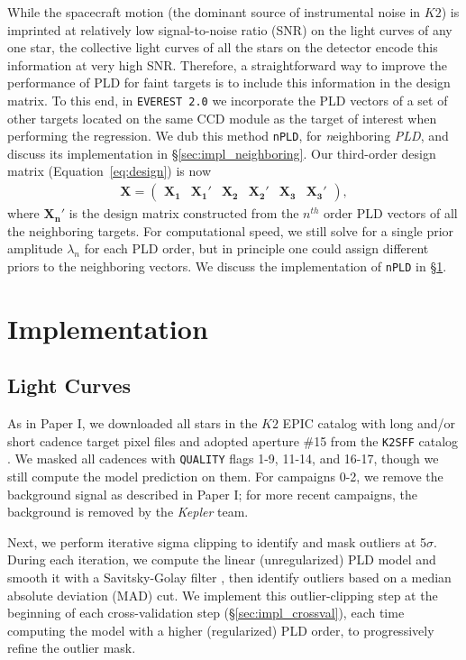 \documentclass[]{emulateapj}
\begin{document}
While the spacecraft motion (the dominant source of instrumental noise in $K2$) is imprinted at relatively
low signal-to-noise ratio (SNR) on the light curves
of any one star, the collective light curves of all the stars on the detector encode
this information at very high SNR. Therefore, a straightforward way to improve the performance of PLD
for faint targets is to include this information in the design matrix. To this end, in \texttt{EVEREST 2.0} we
incorporate the PLD vectors of a set of other targets located on the same CCD module as the target of interest
when performing the regression.
We dub
this method \texttt{nPLD}, for \emph{n}eighboring
\emph{PLD}, and discuss its implementation in \S\ref{sec:impl_neighboring}. Our third-order design
matrix (Equation~\ref{eq:design}) is now
%
\begin{align}
\label{eq:design_nPLD}
\mathbf{X} =
\left(
\begin{array}{cccccc}
  \mathbf{X_1} & \mathbf{X_1'} & \mathbf{X_2} & \mathbf{X_2'} & \mathbf{X_3} & \mathbf{X_3'}
\end{array}
\right),
\end{align}
%
where $\mathbf{X_n'}$ is the design matrix constructed from the $n^{th}$ order PLD vectors of all the
neighboring targets. For computational speed, we still solve for a single prior amplitude $\lambda_n$
for each PLD order, but in principle one could assign different priors to the neighboring vectors. We
discuss the implementation of \texttt{nPLD} in \S\ref{sec:implementation}.

\section{Implementation}
\label{sec:implementation}

\subsection{Light Curves}
\label{sec:impl_lightcurves}
As in Paper I, we downloaded all stars in the $K2$ EPIC catalog with long and/or short cadence
target pixel files and adopted aperture \#15
from the \texttt{K2SFF} catalog \citep{Vanderburg14,VanderburgJohnson14}. We masked all
cadences with \texttt{QUALITY} flags 1-9, 11-14, and 16-17, though we still compute the
model prediction on them. For campaigns 0-2, we remove the background signal as
described in Paper I; for more recent campaigns, the background is removed by the \emph{Kepler}
team.

Next, we perform iterative sigma clipping to identify and mask outliers at 5$\sigma$.
During each iteration, we compute the linear (unregularized) PLD model and smooth it with
a Savitsky-Golay filter \citep{SavitskyGolay64}, then identify outliers based on a
median absolute deviation (MAD) cut. We implement this outlier-clipping step at the
beginning of each cross-validation step (\S\ref{sec:impl_crossval}), each time computing
the model with a higher (regularized) PLD order, to progressively refine the outlier mask.
\end{document}
